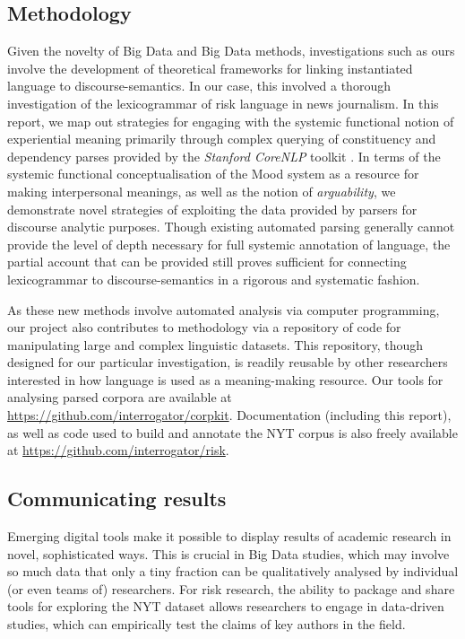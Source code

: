 \documentclass{report}
\begin{document}
\subsection{Methodology}

Given the novelty of Big Data and Big Data methods, investigations such as ours involve the development of theoretical frameworks for linking instantiated language to discourse-semantics. In our case, this involved a thorough investigation of the lexicogrammar of risk language in news journalism. In this report, we map out strategies for engaging with the systemic functional notion of experiential meaning primarily through complex querying of constituency and dependency parses provided by the \emph{Stanford CoreNLP} toolkit \cite{manning_stanford_2014}. In terms of the systemic functional conceptualisation of the Mood system as a resource for making interpersonal meanings, as well as the notion of \emph{arguability}, we demonstrate novel strategies of exploiting the data provided by parsers for discourse analytic purposes. Though existing automated parsing generally cannot provide the level of depth necessary for full systemic annotation of language, the partial account that can be provided still proves sufficient for connecting lexicogrammar to discourse-semantics in a rigorous and systematic fashion.

As these new methods involve automated analysis via computer programming, our project also contributes to methodology via a repository of code for manipulating large and complex linguistic datasets. This repository, though designed for our particular investigation, is readily reusable by other researchers interested in how language is used as a meaning-making resource. Our tools for analysing parsed corpora are available at \url{https://github.com/interrogator/corpkit}. Documentation (including this report), as well as code used to build and annotate the NYT corpus is also freely available at \url{https://github.com/interrogator/risk}.

\subsection{Communicating results}

Emerging digital tools make it possible to display results of academic research in novel, sophisticated ways. This is crucial in Big Data studies, which may involve so much data that only a tiny fraction can be qualitatively analysed by individual (or even teams of) researchers. For risk research, the ability to package and share tools for exploring the NYT dataset allows researchers to engage in data-driven studies, which can empirically test the claims of key authors in the field.
\end{document}
